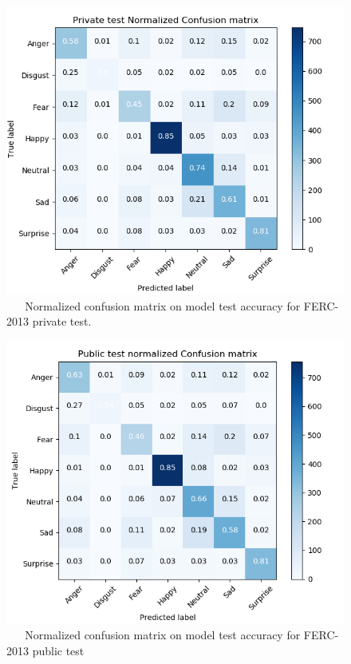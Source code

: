 \documentclass[master]{thesis-uestc}
\begin{document}
\begin{figure}[ht]
\includegraphics[width=5in]{pic/FER-2013_private_test_CM_normalzed.png}
\caption{\,\,\,\,\,\,\,\,\,\,Normalized confusion matrix on model test accuracy for FERC-2013 private test.}
\label{fig_ferpr_cm_scores}
\end{figure}

\begin{figure}[ht]
\includegraphics[width=5in]{pic/FER-2013_public_test_CM_normalzed.png}
\caption{\,\,\,\,\,\,\,\,\,\,Normalized confusion matrix on model test accuracy for FERC-2013 public test}
\label{fig_ferpub_cm_scores}
\end{figure}
\end{document}
